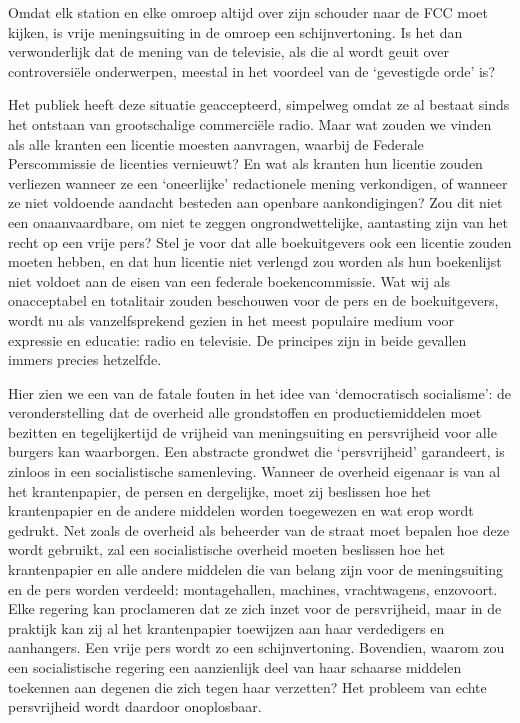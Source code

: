 \documentclass[
  a5paper,
  smalldemyvopaper,10pt,twoside,onecolumn,openright,extrafontsizes,hidelinks]{memoir}
\begin{document}
Omdat elk station en elke omroep altijd over zijn schouder naar de FCC
moet kijken, is vrije meningsuiting in de omroep een schijnvertoning. Is
het dan verwonderlijk dat de mening van de televisie, als die al wordt
geuit over controversiële onderwerpen, meestal in het voordeel van de
`gevestigde orde' is?

Het publiek heeft deze situatie geaccepteerd, simpelweg omdat ze al
bestaat sinds het ontstaan van grootschalige commerciële radio. Maar wat
zouden we vinden als alle kranten een licentie moesten aanvragen,
waarbij de Federale Perscommissie de licenties vernieuwt? En wat als
kranten hun licentie zouden verliezen wanneer ze een `oneerlijke'
redactionele mening verkondigen, of wanneer ze niet voldoende aandacht
besteden aan openbare aankondigingen? Zou dit niet een onaanvaardbare,
om niet te zeggen ongrondwettelijke, aantasting zijn van het recht op
een vrije pers? Stel je voor dat alle boekuitgevers ook een licentie
zouden moeten hebben, en dat hun licentie niet verlengd zou worden als
hun boekenlijst niet voldoet aan de eisen van een federale
boekencommissie. Wat wij als onacceptabel en totalitair zouden
beschouwen voor de pers en de boekuitgevers, wordt nu als
vanzelfsprekend gezien in het meest populaire medium voor expressie en
educatie: radio en televisie. De principes zijn in beide gevallen immers
precies hetzelfde.

Hier zien we een van de fatale fouten in het idee van `democratisch
socialisme': de veronderstelling dat de overheid alle grondstoffen en
productiemiddelen moet bezitten en tegelijkertijd de vrijheid van
meningsuiting en persvrijheid voor alle burgers kan waarborgen. Een
abstracte grondwet die `persvrijheid' garandeert, is zinloos in een
socialistische samenleving. Wanneer de overheid eigenaar is van al het
krantenpapier, de persen en dergelijke, moet zij beslissen hoe het
krantenpapier en de andere middelen worden toegewezen en wat erop wordt
gedrukt. Net zoals de overheid als beheerder van de straat moet bepalen
hoe deze wordt gebruikt, zal een socialistische overheid moeten
beslissen hoe het krantenpapier en alle andere middelen die van belang
zijn voor de meningsuiting en de pers worden verdeeld: montagehallen,
machines, vrachtwagens, enzovoort. Elke regering kan proclameren dat ze
zich inzet voor de persvrijheid, maar in de praktijk kan zij al het
krantenpapier toewijzen aan haar verdedigers en aanhangers. Een vrije
pers wordt zo een schijnvertoning. Bovendien, waarom zou een
socialistische regering een aanzienlijk deel van haar schaarse middelen
toekennen aan degenen die zich tegen haar verzetten? Het probleem van
echte persvrijheid wordt daardoor onoplosbaar.
\end{document}
